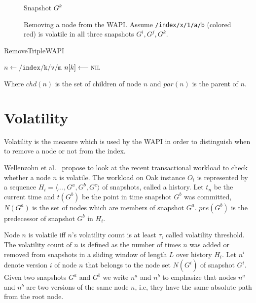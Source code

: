 \documentclass[abstracton,12pt]{scrartcl}
\theoremstyle{definition}
\begin{document}
\begin{figure}[h]
\begin{scriptsize}
\begin{multicols}{3}
\begin{center}
                Snapshot $G^k$
            \end{center}
        \end{multicols}
    \end{scriptsize}
    \caption{Removing a node from the WAPI. Assume \texttt{/index/x/1/a/b} (colored red) is volatile in all three snapshots $G^i, G^j, G^k$.}
    \label{fig:remove_wapi}
\end{figure}

\begin{algorithm}[H]
    \label{algo:remove_triple_wapi}
    \caption{RemoveTripleWAPI}
    \DontPrintSemicolon
    \begin{footnotesize}
        $n \longleftarrow \texttt{/index/k/v/m}$\;
        $n[k] \longleftarrow \textsc{nil}$\;
    \end{footnotesize}
\end{algorithm}
\begin{scriptsize}
    Where $chd(n)$ is the set of children of node $n$ and $par(n)$ is the parent of $n$.
\end{scriptsize}

\section{Volatility}
\label{sec:volatility}

Volatility is the measure which is used by the WAPI in order to distinguish when to remove a node or not from the index.

Wellenzohn et al.~\cite{KW17} propose to look at the recent transactional
workload to check whether a node $n$ is volatile. The workload on Oak instance
$O_i$ is represented by a sequence $H_i = \langle \ldots, G^a, G^b, G^c
\rangle$ of snapshots, called a history. Let $t_n$ be the current time and $t(G^b)$
be the point in time snapshot $G^b$ was committed, $N(G^a)$ is the set of
nodes which are members of snapshot $G^a$.  $pre(G^b)$ is the predecessor of
snapshot $G^b$ in $H_i$.

Node $n$ is volatile iff $n$'s volatility count is at least $\tau$, called volatility threshold.
The volatility count of $n$ is defined as the number of times $n$ was added or removed from snapshots in a sliding window of length $L$ over history $H_i$.
Let $n^i$ denote version $i$ of node $n$ that belongs to the node set $N(G^i)$ of snapshot $G^i$.
Given two snapshots $G^a$ and $G^b$ we write $n^a$ and $n^b$ to emphasize that nodes $n^a$ and $n^b$ are two versions of the same node $n$, i.e, they have the same absolute path from the root node.
\end{document}
